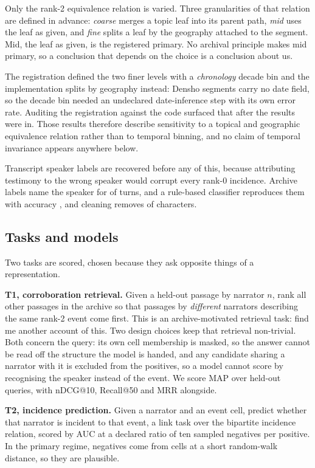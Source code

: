 \documentclass[conference]{IEEEtran}
\begin{document}
Only the rank-2 equivalence relation is varied. Three granularities of that relation are
defined in advance:
\emph{coarse} merges a topic leaf into its parent path, \emph{mid} uses the leaf as given,
and \emph{fine} splits a leaf by the geography attached to the segment. Mid, the leaf as
given, is the registered primary. No archival principle makes mid primary, so a conclusion
that depends on the choice is a conclusion about us.

The registration defined the two
finer levels with a \emph{chronology} decade bin and the implementation splits by
geography instead: Densho segments carry no date field, so the decade bin needed an
undeclared date-inference step with its own error rate. Auditing the registration against the
code surfaced that after the results were in. Those results therefore describe
sensitivity to a topical and geographic equivalence relation rather than to temporal
binning, and no claim of temporal invariance appears anywhere below.

Transcript speaker labels are recovered before any of this, because attributing testimony
to the wrong speaker would corrupt every rank-0 incidence. Archive labels name the speaker for
 of \nTurns{} turns, and a rule-based classifier reproduces them with
accuracy \turnAccuracy{}, and cleaning removes \charsRemoved{} of characters.

\subsection{Tasks and models}
\label{sec:tasks}

Two tasks are scored, chosen because they ask opposite things of a representation.

\textbf{T1, corroboration retrieval.} Given a held-out passage by narrator $n$, rank all
other passages in the archive so that passages by \emph{different} narrators describing the
same rank-2 event come first. This is an archive-motivated retrieval task: find me
another account of this. Two design choices keep that retrieval non-trivial. Both concern the
query: its own cell
membership is masked, so the answer cannot be read off the structure the model is handed, and
any candidate sharing a narrator with it is excluded from the positives, so a model
cannot score by recognising the speaker instead of the event. We score MAP over
\nTOneQueries{} held-out queries, with nDCG@10, Recall@50 and MRR alongside.

\textbf{T2, incidence prediction.} Given a narrator and an event cell, predict whether that
narrator is incident to that event, a link task over the bipartite incidence relation,
scored by AUC at a declared ratio of ten sampled negatives per positive. In the primary
regime, negatives come from cells at a short random-walk distance, so they are plausible.
\end{document}
